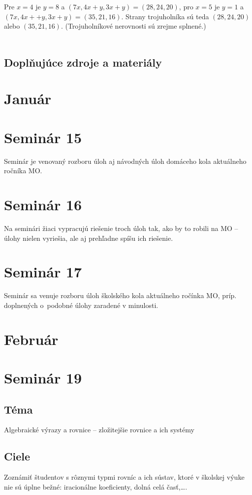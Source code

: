 \documentclass[11pt,a4paper,oneside,final]{book}
\begin{document}
Pre $x = 4$ je $y = 8$ a $(7x, 4x+y, 3x+y) = (28, 24, 20)$, pro $x = 5$ je $y = 1$ a $(7x, 4x+ + y, 3x + y) = (35, 21, 16)$. Strany trojuholníka sú teda $(28, 24, 20)$ alebo $(35, 21, 16)$. (Trojuholníkové nerovnosti sú zrejme splnené.)\\
\\
\subsection*{Doplňujúce zdroje a materiály}
\section{Január}
\section*{Seminár 15}
Seminár je venovaný rozboru úloh aj návodných úloh domáceho kola aktuálneho ročníka MO.

\section*{Seminár 16}
Na seminári žiaci vypracujú riešenie troch úloh tak, ako by to robili na MO -- úlohy nielen vyriešia, ale aj prehľadne spíšu ich riešenie.

\section*{Seminár 17}
Seminár sa venuje rozboru úloh školského kola aktuálneho ročínka MO, príp. doplnených o~podobné úlohy zaradené v minulosti.


\newpage
\section{Február}
\section*{Seminár 19}
\subsection*{Téma}
Algebraické výrazy a rovnice -- zložitejšie rovnice a ich systémy


\subsection*{Ciele}
Zoznámiť študentov s rôznymi typmi rovníc a ich sústav, ktoré v školskej výuke nie sú úplne bežné: iracionálne koeficienty, dolná celá časť,\ldots.
\end{document}
